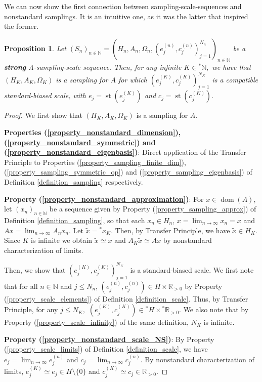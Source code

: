 \documentclass[10pt,a4paper]{amsart}
\newtheorem{prop}[thm]{Proposition}
\def \Dom{\operatorname{dom}}
\def \St{\operatorname{st}}
\begin{document}
We can now show the first connection between sampling-scale-sequences and nonstandard samplings. It is an intuitive one, as it was the latter that inspired the former.

\begin{prop}
	Let $(S_n)_{n\in\mathbb{N}}=(H_n,A_n,\Omega_n, (e_j^{(n)},c_j^{(n)})_{j=1}^{N_n})_{n\in\mathbb{N}}$ be a \textbf{strong} A-sampling-scale sequence. Then, for any infinite $K\in{}^*\mathbb{N},$ we have that $(H_K, A_K, \Omega_K)$ is a sampling for $A$ for which $(e_j^{(K)},c_j^{(K)})_{j=1}^{N_K}$ is a compatible standard-biased scale, with $e_j=\St(e_j^{(K)})$ and $c_j=\St(c_j^{(K)}).$
\end{prop}
\begin{proof}
	We first show that $(H_K, A_K, \Omega_K)$ is a sampling for $A$.
	
	\textbf{Properties (\ref{property_nonstandard_dimension}), (\ref{property_nonstandard_symmetric}) and (\ref{property_nonstandard_eigenbasis})}: Direct application of the Transfer Principle to Properties (\ref{property_sampling_finite_dim}),(\ref{property_sampling_symmetric_op}) and (\ref{property_sampling_eigenbasis})  of Definition \ref{definition_sampling} respectively.
	
	\textbf{Property (\ref{property_nonstandard_approximation})}: For $x\in\Dom(A)$, let $(x_n)_{n\in\mathbb{N}}$ be a sequence given by Property (\ref{property_sampling_approx}) of Definition \ref{definition_sampling}, so that each $x_n\in H_n$, $x=\lim_{n\rightarrow\infty}x_n=x$ and $Ax=\lim_{n\rightarrow\infty}A_nx_n.$ Let $\tilde{x}={}^*x_K$. Then, by Transfer Principle, we have $\tilde{x}\in H_K$. Since $K$ is infinite we obtain $\tilde{x}\simeq x$ and $A_K \tilde{x}\simeq Ax$ by nonstandard characterization of limits.
	
	Then, we show that $(e_j^{(K)},c_j^{(K)})_{j=1}^{N_K}$ is a standard-biased scale. We first note that for all $n\in\mathbb{N}$ and $j\leq N_n$, $(e_j^{(n)},c_j^{(n)})\in H\times \mathbb{R}_{>0}$ by Property (\ref{property_scale_elements}) of Definition \ref{definition_scale}. Thus, by Transfer Principle, for any $j\leq N_K,$ $(e_j^{(K)},c_j^{(K)})\in {}^*H\times {}^*\mathbb{R}_{>0}$. We also note that by Property (\ref{property_scale_infinity}) of the same definition, $N_K$ is infinite.
	
	\textbf{Property (\ref{property_nonstandard_scale_NS})}: By Property (\ref{property_scale_limits}) of Definition \ref{definition_scale}, we have $e_j=\lim_{n\rightarrow\infty}e_j^{(n)}$ and $c_j=\lim_{n\rightarrow\infty} c_j^{(n)}.$ By nonstandard characterization of limits, $e_j^{(K)}\simeq e_j\in H\setminus\{0\}$ and $c_j^{(K)}\simeq c_j\in\mathbb{R}_{>0}.$
	

\end{proof}
\end{document}

